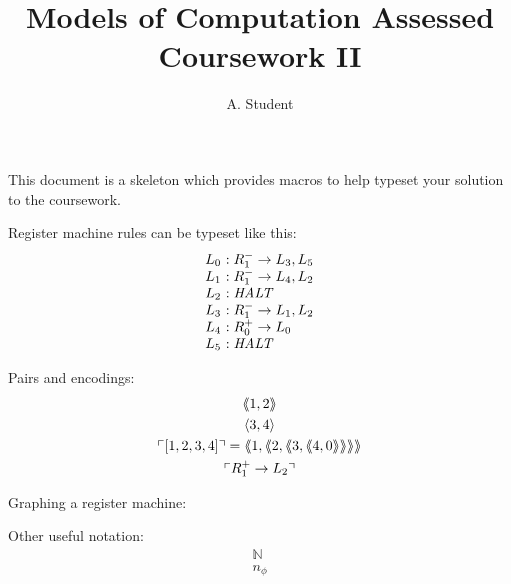\documentclass[11pt,a4paper]{article}
\newcommand{\ang}[1]{\langle #1 \rangle}
\newcommand{\ra}{\rightarrow}
\newcommand{\START}{\mathit{START}}
\newcommand{\HALT}{\mathit{HALT}}
\newcommand{\uinc}[2]{#1^+ \ra L_{#2}}
\newcommand{\udec}[3]{#1^- \ra L_{#2}, L_{#3}}
\newcommand{\iinc}[3]{L_{#1} & : \uinc{#2}{#3} \\}
\newcommand{\idec}[4]{L_{#1} & : \udec{#2}{#3}{#4} \\}
\newcommand{\ihalt}[1]{L_{#1} & : \HALT \\}
\newcommand{\code}[1]{\ulcorner{#1}\urcorner}
\newcommand{\ppair}[1]{\langle\hspace{-0.6ex}\langle #1 \rangle\hspace{-0.6ex}\rangle}
\newcommand{\pair}[1]{\ang{#1}}
\begin{document}
\title{Models of Computation Assessed Coursework II}
\author{A. Student}

\maketitle

This document is a skeleton which provides macros to help typeset your solution to the coursework.

Register machine rules can be typeset like this:
  \[ \begin{array}{r@{\ }l}
    \idec{0}{R_1}{3}{5}
    \idec{1}{R_1}{4}{2}
    \ihalt{2}
    \idec{3}{R_1}{1}{2}
    \iinc{4}{R_0}{0}
    \ihalt{5}
  \end{array} \]

Pairs and encodings:
\begin{gather*}
    \ppair{1,2} \\
    \pair{3,4} \\
    \code{[1,2,3,4]} = \ppair{1,\ppair{2,\ppair{3,\ppair{4,0}}}} \\
    \code{\uinc{R_1}{2}}
\end{gather*}

Graphing a register machine:
    \begin{center}
    \end{center}

Other useful notation:
\begin{gather*}
    \mathbb{N} \\
    n_\phi
\end{gather*}
\end{document}
